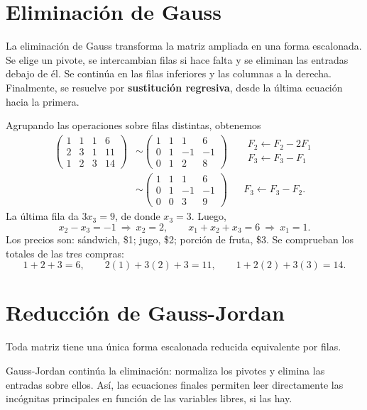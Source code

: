 \documentclass[compacto,10pt]{pubciencias-notas}
\begin{document}
\section{Eliminación de Gauss}
La eliminación de Gauss transforma la matriz ampliada en una forma escalonada.
Se elige un pivote, se intercambian filas si hace falta y se eliminan las
entradas debajo de él. Se continúa en las filas inferiores y las columnas
a la derecha. Finalmente, se resuelve por \textbf{sustitución regresiva},
desde la última ecuación hacia la primera.

\begin{ejem}\label{ej:gauss}
Agrupando las operaciones sobre filas distintas, obtenemos
\begin{align*}
\left(\begin{array}{ccc|c}1&1&1&6\\2&3&1&11\\1&2&3&14\end{array}\right)
&\sim
\left(\begin{array}{ccc|c}1&1&1&6\\0&1&-1&-1\\0&1&2&8\end{array}\right)
&&\begin{array}{l}F_2\leftarrow F_2-2F_1\\F_3\leftarrow F_3-F_1\end{array}\\
&\sim
\left(\begin{array}{ccc|c}1&1&1&6\\0&1&-1&-1\\0&0&3&9\end{array}\right)
&&F_3\leftarrow F_3-F_2.
\end{align*}
La última fila da $3x_3=9$, de donde $x_3=3$. Luego,
\[
x_2-x_3=-1\ \Rightarrow\ x_2=2,
\qquad
x_1+x_2+x_3=6\ \Rightarrow\ x_1=1.
\]
Los precios son: sándwich, \$1; jugo, \$2; porción de fruta, \$3.
Se comprueban los totales de las tres compras:
\[
1+2+3=6,\qquad 2(1)+3(2)+3=11,\qquad 1+2(2)+3(3)=14.
\]
\end{ejem}
\newpage
\section{Reducción de Gauss-Jordan}
Toda matriz tiene una única forma escalonada reducida equivalente por filas.

Gauss-Jordan continúa la eliminación: normaliza los pivotes y elimina las
entradas sobre ellos. Así, las ecuaciones finales permiten leer directamente
las incógnitas principales en función de las variables libres, si las hay.
\end{document}
